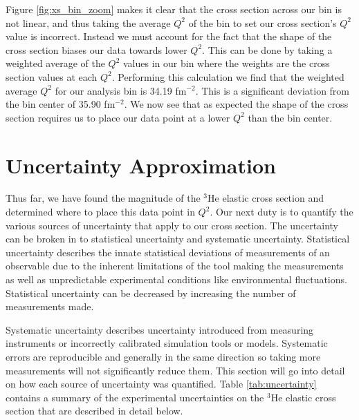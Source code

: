 Figure \ref{fig:xs_bin_zoom} makes it clear that the cross section across our bin is not linear, and thus taking the average $Q^2$ of the bin to set our cross section's $Q^2$ value is incorrect. Instead we must account for the fact that the shape of the cross section biases our data towards lower $Q^2$. This can be done by taking a weighted average of the $Q^2$ values in our bin where the weights are the cross section values at each $Q^2$. Performing this calculation we find that the weighted average $Q^2$ for our analysis bin is 34.19 fm$^{-2}$. This is a significant deviation from the bin center of 35.90 fm$^{-2}$. We now see that as expected the shape of the cross section requires us to place our data point at a lower $Q^2$ than the bin center.

\section{Uncertainty Approximation}
\label{sec:uncertainty}

Thus far, we have found the magnitude of the $^3$He elastic cross section and determined where to place this data point in $Q^2$. Our next duty is to quantify the various sources of uncertainty that apply to our cross section. The uncertainty can be broken in to statistical uncertainty and systematic uncertainty. Statistical uncertainty describes the innate statistical deviations of measurements of an observable due to the inherent limitations of the tool making the measurements as well as unpredictable experimental conditions like environmental fluctuations. Statistical uncertainty can be decreased by increasing the number of measurements made. 

Systematic uncertainty describes uncertainty introduced from measuring instruments or incorrectly calibrated simulation tools or models. Systematic errors are reproducible and generally in the same direction so taking more measurements will not significantly reduce them. This section will go into detail on how each source of uncertainty was quantified. Table \ref{tab:uncertainty} contains a summary of the experimental uncertainties on the $^3$He elastic cross section that are described in detail below.

\vspace{5mm}


